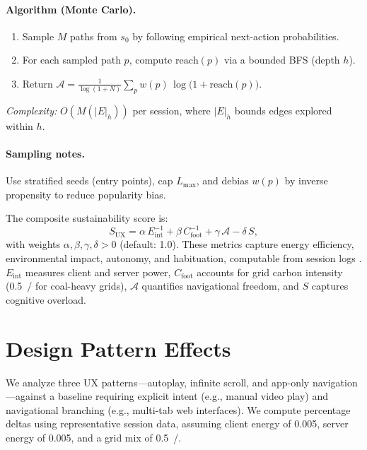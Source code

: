 \documentclass[openany]{book}
\newcommand{\Sent}{S} %
\newcommand{\Eint}{E_{\mathrm{int}}} %
\newcommand{\Cfoot}{C_{\mathrm{foot}}} %
\newcommand{\Auton}{\mathcal{A}} %
\newcommand{\SUX}{S_{\mathrm{UX}}} %
\newcommand{\kWh}{\mathrm{kWh}}
\begin{document}
\paragraph{Algorithm (Monte Carlo).}
\begin{enumerate}[leftmargin=*,itemsep=2pt]
\item Sample $M$ paths from $s_0$ by following empirical next-action probabilities.
\item For each sampled path $p$, compute $\mathrm{reach}(p)$ via a bounded BFS (depth $h$).
\item Return $\Auton = \frac{1}{\log(1+N)}\sum_{p} w(p)\,\log\big(1+\mathrm{reach}(p)\big)$.
\end{enumerate}
\emph{Complexity:} $O\!\left(M(|E|_h)\right)$ per session, where $|E|_h$ bounds edges explored within $h$.

\paragraph{Sampling notes.} Use stratified seeds (entry points), cap $L_{\max}$, and debias $w(p)$ by inverse propensity to reduce popularity bias.

The composite sustainability score is:
\begin{equation}
\label{eq:SUX}
\SUX = \alpha\,\Eint^{-1} + \beta\,\Cfoot^{-1} + \gamma\,\Auton - \delta\,\Sent,
\end{equation}
with weights \(\alpha, \beta, \gamma, \delta > 0\) (default: 1.0). These metrics capture energy efficiency, environmental impact, autonomy, and habituation, computable from session logs \citep{extentia2024}. \(\Eint\) measures client and server power, \(\Cfoot\) accounts for grid carbon intensity (\SI{0.5}{\kgCOe/\kWh} for coal-heavy grids), \(\Auton\) quantifies navigational freedom, and \(\Sent\) captures cognitive overload.

\section{Design Pattern Effects}
\label{sec:pattern-effects}
We analyze three UX patterns---autoplay, infinite scroll, and app-only navigation---against a baseline requiring explicit intent (e.g., manual video play) and navigational branching (e.g., multi-tab web interfaces). We compute percentage deltas using representative session data, assuming client energy of \SI{0.005}{\kWh}, server energy of \SI{0.005}{\kWh}, and a grid mix of \SI{0.5}{\kgCOe/\kWh}.
\end{document}
